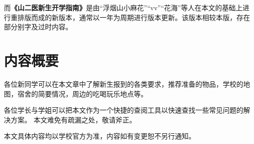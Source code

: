 而\textbf{《山二医新生开学指南》}是由“浮烟山小麻花”“vv”“花海”等人在本文的基础上进行重排版而成的新版本，通常以一年为周期进行版本更新。该版本相较本版，存在部分别字及过时内容。

\textbf{}

\section[内容概要]{内容概要}
\vspace{-1em}

各位新同学可以在本文章中了解新生报到的各类要求，推荐准备的物品，学校的地图，宿舍的简要情况，周边的吃喝玩乐地点等。

各位学长与学姐可以把本文作为一个快捷的查阅工具以快速查找一些常见问题的解决方案。
\bigbreak
本文难免有疏漏之处，敬请斧正。

本文具体内容均以学校官方为准，内容如有变更恕不另行通知。